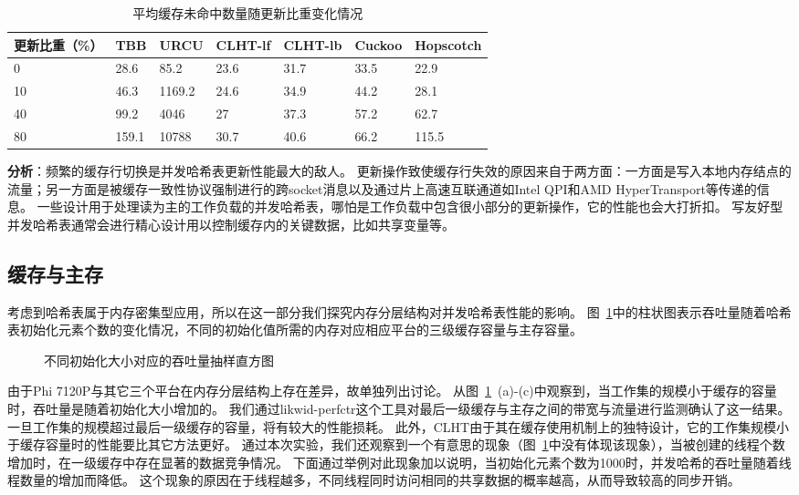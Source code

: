 \begin{table}[htbp]
  \centering
  \caption{平均缓存未命中数量随更新比重变化情况}
  \label{tab:cache_misses_update}
  \begin{tabular}{lllllll}
    \toprule
       更新比重（\%） & TBB & URCU & CLHT-lf & CLHT-lb & Cuckoo & Hopscotch  \\
    \midrule
     0 & 28.6 & 85.2 & 23.6 & 31.7 & 33.5 & 22.9  \\
      10 & 46.3 & 1169.2 & 24.6 & 34.9 & 44.2 & 28.1 \\
      40 & 99.2 & 4046 & 27 & 37.3 & 57.2 & 62.7 \\
      80 & 159.1 & 10788 & 30.7 & 40.6 & 66.2 & 115.5  \\
    \bottomrule
  \end{tabular}
  \label{tab:cache_miss_update}
\end{table}

\textbf{分析}：频繁的缓存行切换是并发哈希表更新性能最大的敌人。
更新操作致使缓存行失效的原因来自于两方面：一方面是写入本地内存结点的流量；另一方面是被缓存一致性协议强制进行的跨socket消息以及通过片上高速互联通道如Intel QPI和AMD HyperTransport等传递的信息。
一些设计用于处理读为主的工作负载的并发哈希表，哪怕是工作负载中包含很小部分的更新操作，它的性能也会大打折扣。
写友好型并发哈希表通常会进行精心设计用以控制缓存内的关键数据，比如共享变量等。

\subsection{缓存与主存}
考虑到哈希表属于内存密集型应用，所以在这一部分我们探究内存分层结构对并发哈希表性能的影响。
图~\ref{fig:initial_size}中的柱状图表示吞吐量随着哈希表初始化元素个数的变化情况，不同的初始化值所需的内存对应相应平台的三级缓存容量与主存容量。

\begin{figure}[htbp]
\centering
\caption{不同初始化大小对应的吞吐量抽样直方图}
\label{fig:initial_size}
\end{figure}

由于Phi 7120P与其它三个平台在内存分层结构上存在差异，故单独列出讨论。
从图~\ref{fig:initial_size}~(a)-(c)中观察到，当工作集的规模小于缓存的容量时，吞吐量是随着初始化大小增加的。
我们通过likwid-perfctr这个工具对最后一级缓存与主存之间的带宽与流量进行监测确认了这一结果。
一旦工作集的规模超过最后一级缓存的容量，将有较大的性能损耗。
此外，CLHT由于其在缓存使用机制上的独特设计，它的工作集规模小于缓存容量时的性能要比其它方法更好。
通过本次实验，我们还观察到一个有意思的现象（图~\ref{fig:initial_size}中没有体现该现象），当被创建的线程个数增加时，在一级缓存中存在显著的数据竞争情况。
下面通过举例对此现象加以说明，当初始化元素个数为1000时，并发哈希的吞吐量随着线程数量的增加而降低。
这个现象的原因在于线程越多，不同线程同时访问相同的共享数据的概率越高，从而导致较高的同步开销。

